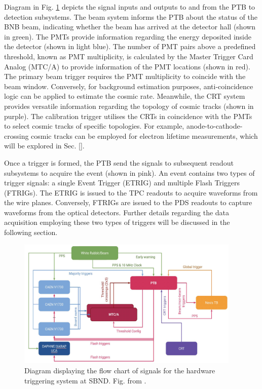 Diagram in Fig. \ref{fig:SBND_Trigger} depicts the signal inputs and outputs to and from the PTB to detection subsystems.
The beam system informs the PTB about the status of the BNB beam, indicating whether the beam has arrived at the detector hall (shown in green).
The PMTs provide information regarding the energy deposited inside the detector (shown in light blue).
The number of PMT pairs above a predefined threshold, known as PMT multiplicity, is calculated by the Master Trigger Card Analog (MTC/A) to provide information of the PMT locations (shown in red).
The primary beam trigger requires the PMT multiplicity to coincide with the beam window. 
Conversely, for background estimation purposes, anti-coincidence logic can be applied to estimate the cosmic rate.
Meanwhile, the CRT system provides versatile information regarding the topology of cosmic tracks (shown in purple). 
The calibration trigger utilises the CRTs in coincidence with the PMTs to select cosmic tracks of specific topologies. 
For example, anode-to-cathode-crossing cosmic tracks can be employed for electron lifetime measurements, which will be explored in Sec. \ref{}.

Once a trigger is formed, the PTB send the signals to subsequent readout subsystems to acquire the event (shown in pink).
An event contains two types of trigger signals: a single Event Trigger (ETRIG) and multiple Flash Triggers (FTRIGs).
The ETRIG is issued to the TPC readouts to acquire waveforms from the wire planes. 
Conversely, FTRIGs are issued to the PDS readouts to capture waveforms from the optical detectors. 
Further details regarding the data acquisition employing these two types of triggers will be discussed in the following section.

\begin{figure}[tbp] 
\centering    
\includegraphics[width=0.95\textwidth]{SBND_Trigger}
\caption[SBND_PDS]{
Diagram displaying the flow chart of signals for the hardware triggering system at SBND.
Fig. from \cite{}.
}
\label{fig:SBND_Trigger}
\end{figure}
